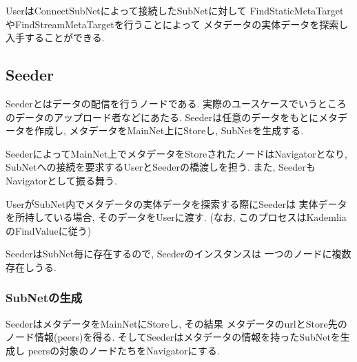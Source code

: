 \documentclass[sotsuron]{jcsie}
\begin{document}
UserはConnectSubNetによって接続したSubNetに対して
FindStaticMetaTargetやFindStreamMetaTargetを行うことによって
メタデータの実体データを探索し入手することができる.

\subsection{Seeder}
Seederとはデータの配信を行うノードである.
実際のユースケースでいうところのデータのアップロード者などにあたる.
Seederは任意のデータをもとにメタデータを作成し, 
メタデータをMainNet上にStoreし, SubNetを生成する.

SeederによってMainNet上でメタデータをStoreされたノードはNavigatorとなり, 
SubNetへの接続を要求するUserとSeederの橋渡しを担う.
また, SeederもNavigatorとして振る舞う.

UserがSubNet内でメタデータの実体データを探索する際にSeederは
実体データを所持している場合, そのデータをUserに渡す.
(なお, このプロセスはKademliaのFindValueに従う)

SeederはSubNet毎に存在するので, Seederのインスタンスは
一つのノードに複数存在しうる.

\subsubsection{SubNetの生成}
SeederはメタデータをMainNetにStoreし, その結果
メタデータのurlとStore先のノード情報(peers)を得る.
そしてSeederはメタデータの情報を持ったSubNetを生成し
peersの対象のノードたちをNavigatorにする.
\end{document}

